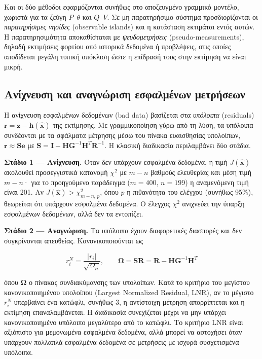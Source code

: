 Και οι δύο μέθοδοι εφαρμόζονται συνήθως στο αποζευγμένο γραμμικό μοντέλο, χωριστά για τα
ζεύγη $P$--$\theta$ και $Q$--$V$. Σε μη παρατηρήσιμο σύστημα προσδιορίζονται οι
\emph{παρατηρήσιμες νησίδες} (observable islands) και η κατάσταση εκτιμάται εντός αυτών. Η
παρατηρησιμότητα αποκαθίσταται με \emph{ψευδομετρήσεις} (pseudo-measurements), δηλαδή
εκτιμήσεις φορτίου από ιστορικά δεδομένα ή προβλέψεις, στις οποίες αποδίδεται μεγάλη τυπική
απόκλιση ώστε η επίδρασή τους στην εκτίμηση να είναι μικρή.

\subsection{Ανίχνευση και αναγνώριση εσφαλμένων μετρήσεων}
\label{sec:baddata}

Η ανίχνευση εσφαλμένων δεδομένων (bad data) βασίζεται στα \emph{υπόλοιπα} (residuals)
$\mathbf{r} = \mathbf{z}-\mathbf{h}(\hat{\mathbf{x}})$ της εκτίμησης. Με γραμμικοποίηση γύρω από
τη λύση, τα υπόλοιπα συνδέονται με τα σφάλματα μέτρησης μέσω του πίνακα ευαισθησίας
υπολοίπων, $\mathbf{r} \approx \mathbf{S}\mathbf{e}$ με
$\mathbf{S} = \mathbf{I} - \mathbf{H}\mathbf{G}^{-1}\mathbf{H}^{T}\mathbf{R}^{-1}$. Η κλασική
διαδικασία περιλαμβάνει δύο στάδια.

\textbf{Στάδιο 1 --- Ανίχνευση.} Όταν δεν υπάρχουν εσφαλμένα δεδομένα, η τιμή
$J(\hat{\mathbf{x}})$ ακολουθεί προσεγγιστικά κατανομή $\chi^2$ με $m-n$ βαθμούς ελευθερίας
και μέση τιμή $m-n$· για το προηγούμενο παράδειγμα ($m = 400$, $n = 199$) η αναμενόμενη τιμή
είναι 201. Αν $J(\hat{\mathbf{x}}) > \chi^2_{m-n,\,p}$, όπου $p$ η πιθανότητα του ελέγχου
(συνήθως 95\%), θεωρείται ότι υπάρχουν εσφαλμένα δεδομένα. Ο έλεγχος $\chi^2$ ανιχνεύει την
ύπαρξη εσφαλμένων δεδομένων, αλλά δεν τα εντοπίζει.

\textbf{Στάδιο 2 --- Αναγνώριση.} Τα υπόλοιπα έχουν διαφορετικές διασπορές και δεν
συγκρίνονται απευθείας. Κανονικοποιούνται ως

\begin{equation}
r_i^{N} = \frac{|r_i|}{\sqrt{\Omega_{ii}}}, \qquad
\boldsymbol{\Omega} = \mathbf{S}\mathbf{R} = \mathbf{R} - \mathbf{H}\mathbf{G}^{-1}\mathbf{H}^{T}
\label{eq:normres}
\end{equation}

όπου $\boldsymbol{\Omega}$ ο πίνακας συνδιακύμανσης των υπολοίπων. Κατά το κριτήριο του
μεγίστου κανονικοποιημένου υπολοίπου (Largest Normalized Residual, LNR), αν το μέγιστο
$r_i^{N}$ υπερβαίνει ένα κατώφλι, συνήθως 3, η αντίστοιχη μέτρηση απορρίπτεται και η
εκτίμηση επαναλαμβάνεται. Η διαδικασία συνεχίζεται μέχρι να μην υπάρχει κανονικοποιημένο
υπόλοιπο μεγαλύτερο από το κατώφλι. Το κριτήριο LNR είναι αξιόπιστο για μεμονωμένα
εσφαλμένα δεδομένα, αλλά μπορεί να αστοχήσει όταν υπάρχουν πολλαπλά εσφαλμένα δεδομένα σε
μετρήσεις με ισχυρά συσχετισμένα υπόλοιπα.

